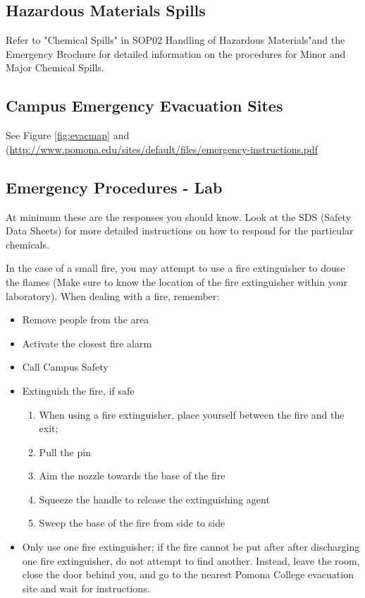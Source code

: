 \documentclass[12pt]{../../cls/SOP4_alpha}\usepackage[]{graphicx}\usepackage[]{xcolor}
\begin{document}
\subsection{Hazardous Materials Spills}

\NP Refer to "Chemical Spills" in SOP02 Handling of Hazardous Materials"and the Emergency Brochure for detailed information on the procedures for Minor and Major Chemical Spills.

\subsection{Campus Emergency Evacuation Sites}

See Figure \ref{fig:evacmap} and (\href{Pomona College Emergiency Instruction}{http://www.pomona.edu/sites/default/files/emergency-instructions.pdf}

\subsection*{Emergency Procedures - Lab}

\NP At minimum these are the responses you should know. Look at the SDS (Safety Data Sheets) for more detailed instructions on how to respond for the particular chemicals.  

\NP In the case of a small fire, you may attempt to use a fire extinguisher to douse the flames (Make sure to know the location of the fire extinguisher within your laboratory). 
When dealing with a fire, remember:

\begin{itemize}
  \item Remove people from the area
  \item Activate the closest fire alarm
  \item Call Campus Safety
  \item Extinguish the fire, if safe
    \begin{enumerate}
      \item When using a fire extinguisher, place yourself between the fire and the exit; 
	    \item Pull the pin
	    \item Aim the nozzle towards the base of the fire
	    \item Squeeze the handle to release the extinguishing agent
	    \item Sweep the base of the fire from side to side
    \end{enumerate}

  \item Only use one fire extinguisher; if the fire cannot be put after after discharging one fire extinguisher, do not attempt to find another. Instead, leave the room, close the door behind you, and go to the nearest Pomona College evacuation site and wait for instructions.
  
\end{itemize}
\end{document}

